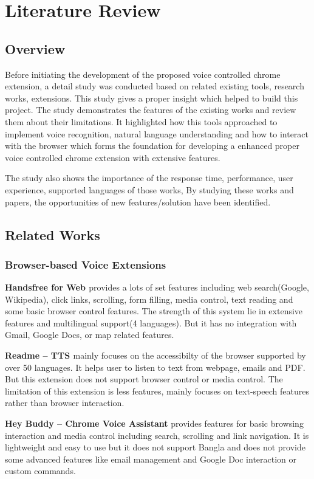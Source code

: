 
\chapter{Literature Review}
	\label{chapter:2}
	\section{Overview}
	Before initiating the development of the proposed voice controlled chrome extension, a detail study was conducted based on related existing tools, research works, extensions. This study gives a proper insight which helped to build this project. The study demonstrates the features of the existing works and review them about their limitations. It highlighted how this tools approached to implement voice recognition, natural language understanding and how to interact with the browser which forms the foundation for developing a enhanced proper voice controlled chrome extension with extensive features.
	
	The study also shows the importance of the response time, performance, user experience, supported languages of those works, By studying these works and papers, the opportunities of new features/solution have been identified.
	
	\section{Related Works}
	
	\subsection{Browser-based Voice Extensions}
	\textbf{Handsfree for Web \cite{handsfree}} provides a lots of set features including web search(Google, Wikipedia), click links, scrolling, form filling, media control, text reading and some basic browser control features. The strength of this system lie in extensive features and multilingual support(4 languages). But it has no integration with Gmail, Google Docs, or map related features.
	
	\textbf{Readme – TTS \cite{readme}} mainly focuses on the accessibilty of the browser supported by over 50 languages. It helps user to listen to text from webpage, emails and PDF. But this extension does not support browser control or media control. The limitation of this extension is less features, mainly focuses on text-speech features rather than browser interaction.
	
	\textbf{Hey Buddy – Chrome Voice Assistant\cite{heybuddy}} provides features for basic browsing interaction and media control including search, scrolling and link navigation. It is lightweight and easy to use but it does not support Bangla and does not provide some advanced features like email management and Google Doc interaction or custom commands.
	
